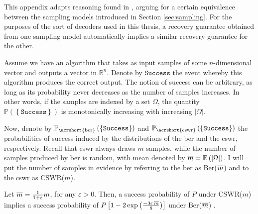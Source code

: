 This appendix adapts reasoning found in \cite[Appendix]{candes2011a}, arguing for a certain equivalence between the sampling models introduced in Section \ref{sec:sampling}. For the purposes of the sort of decoders used in this thesis, a recovery guarantee obtained from one sampling model automatically implies a similar recovery guarantee for the other.

Assume we have an algorithm that takes as input samples of some $n$-dimensional vector and outputs a vector in $\mathbb{R}^{n}$. Denote by $\texttt{Success}$ the event whereby this algorithm produces the correct output. The notion of success can be arbitrary, as long as its probability never decreases as the number of samples increases. In other words, if the samples are indexed by a set $\Omega$, the quantity $\mathbb{P} \left ( \left \{ \texttt{Success} \right \}\right )$ is monotonically increasing with increasing $|\Omega|$.

Now, denote by $\mathbb{P}_{\text{\acrshort{ber}}} \left ( \left \{  \texttt{Success} \right \}\right )$ and $\mathbb{P}_{\text{\acrshort{cswr}}} \left ( \left \{  \texttt{Success} \right \}\right )$ the probabilities of success induced by the distributions of the \acrfull{ber} and the \acrfull{cswr}, respectively. Recall that \acrshort{cswr} always draws $m$ samples, while the number of samples produced by \acrshort{ber} is random, with mean denoted by $\mathop{\overline{m}} = \mathbb{E} \left ( |\Omega| \right )$. I will put the number of samples in evidence by referring to the \acrlong{ber} as Ber($\mathop{\overline{m}}$) and to the \acrlong{cswr} as CSWR($m$).

\begin{lemma}
    Let $\mathop{\overline{m}} = \frac{1}{1 + \varepsilon} m$, for any $\varepsilon > 0$. Then, a success probability of $P$ under CSWR($m$) implies a success probability of $P \left [ 1 - 2 \exp \left ( \frac{-3 \varepsilon \mathop{\overline{m}}}{8} \right ) \right ]$ under Ber($\mathop{\overline{m}}$) .
\end{lemma}

